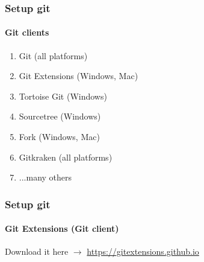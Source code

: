 \documentclass{beamer}
\newcommand{\adjustimg}{%
  \checkoddpage%
  \ifoddpage\hspace*{\dimexpr\evensidemargin-\oddsidemargin}\else\hspace*{-\dimexpr\evensidemargin-\oddsidemargin}\fi%
}
\newcommand{\centerimg}[2][width=\textwidth]{%
  \makebox[\textwidth]{\adjustimg\texttt{[image: \#2]}}%
}
\begin{document}
    \begin{frame}
        \frametitle{Setup git}
        \framesubtitle{Git clients}
        \begin{enumerate}
            \item Git (all platforms)
            \item Git Extensions (Windows, Mac)
            \item Tortoise Git (Windows)
            \item Sourcetree (Windows)
            \item Fork (Windows, Mac)
            \item Gitkraken (all platforms)
            \item ...many others
        \end{enumerate}
    \end{frame}
    \begin{frame}
        \frametitle{Setup git}
        \framesubtitle{Git Extensions (Git client)}
        \noindent\centerimg[width=\paperwidth]{gitex.png} 
        Download it here $\rightarrow$ \url{https://gitextensions.github.io}
    \end{frame}
\end{document}
